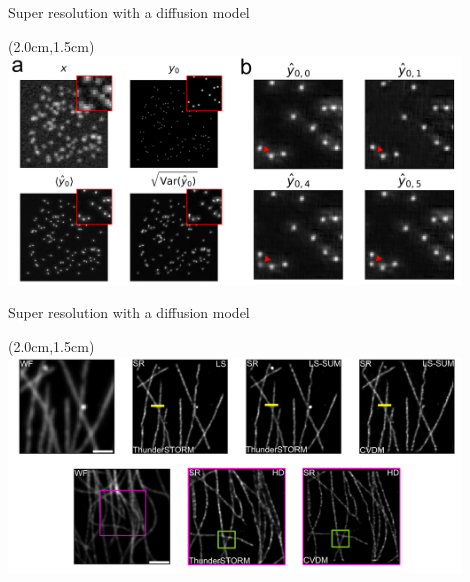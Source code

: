 \documentclass{beamer}					%
\begin{document}

\begin{frame}{Super resolution with a diffusion model}
\begin{textblock*}{12cm}(2.0cm,1.5cm)
\includegraphics[width=12cm]{../../phd/ddpm/ddpm/media/Figure-2-1-crop.png}
\end{textblock*}
\end{frame}

\begin{frame}{Super resolution with a diffusion model}
\begin{textblock*}{12cm}(2.0cm,1.5cm)
\includegraphics[width=12cm]{../../postdoc/sartorius/media/Tubes-Crop.png}
\end{textblock*}
\end{frame}
\end{document}

